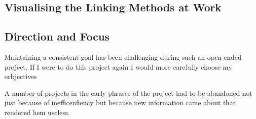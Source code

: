 \documentclass[12pt]{article}
\begin{document}

\subsection{Visualising the Linking Methods at Work}






















\subsection{Direction and Focus}

Maintaining a consistent goal has been challenging during such an open-ended project. If I were to do this project again I would more carefully choose my orbjectives %

A number of projects in the early phrases of the project had to be abandoned not just because of inefficenfiency but because new information came about that rendered hem useless.
\end{document}
